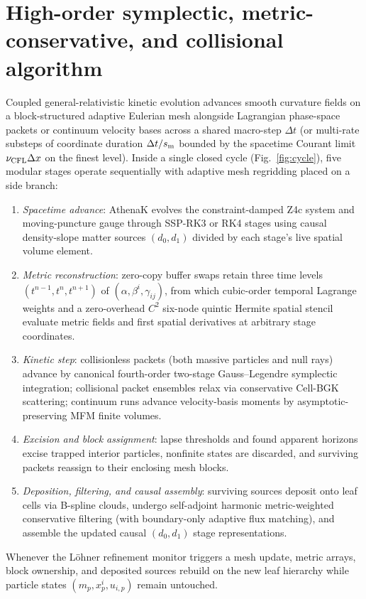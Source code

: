 \section{High-order symplectic, metric-conservative, and collisional algorithm}\label{sec:method}

Coupled general-relativistic kinetic evolution advances smooth curvature fields on a block-structured adaptive Eulerian mesh alongside Lagrangian phase-space packets or continuum velocity bases across a shared macro-step $\Delta t$ (or multi-rate substeps of coordinate duration $\Delta t/s_{\rm m}$ bounded by the spacetime Courant limit $\nu_{\rm CFL}\Delta x$ on the finest level). Inside a single closed cycle (Fig.~\ref{fig:cycle}), five modular stages operate sequentially with adaptive mesh regridding placed on a side branch:
\begin{enumerate}
\item \emph{Spacetime advance}: AthenaK evolves the constraint-damped Z4c system and moving-puncture gauge through SSP-RK3 or RK4 stages using causal density-slope matter sources $(d_0, d_1)$ divided by each stage's live spatial volume element.
\item \emph{Metric reconstruction}: zero-copy buffer swaps retain three time levels $(t^{n-1}, t^n, t^{n+1})$ of $(\alpha, \beta^i, \gamma_{ij})$, from which cubic-order temporal Lagrange weights and a zero-overhead $C^2$ six-node quintic Hermite spatial stencil evaluate metric fields and first spatial derivatives at arbitrary stage coordinates.
\item \emph{Kinetic step}: collisionless packets (both massive particles and null rays) advance by canonical fourth-order two-stage Gauss--Legendre symplectic integration; collisional packet ensembles relax via conservative Cell-BGK scattering; continuum runs advance velocity-basis moments by asymptotic-preserving MFM finite volumes.
\item \emph{Excision and block assignment}: lapse thresholds and found apparent horizons excise trapped interior particles, nonfinite states are discarded, and surviving packets reassign to their enclosing mesh blocks.
\item \emph{Deposition, filtering, and causal assembly}: surviving sources deposit onto leaf cells via B-spline clouds, undergo self-adjoint harmonic metric-weighted conservative filtering (with boundary-only adaptive flux matching), and assemble the updated causal $(d_0, d_1)$ stage representations.
\end{enumerate}
Whenever the L\"ohner refinement monitor triggers a mesh update, metric arrays, block ownership, and deposited sources rebuild on the new leaf hierarchy while particle states $(m_p, x_p^i, u_{i,p})$ remain untouched.

